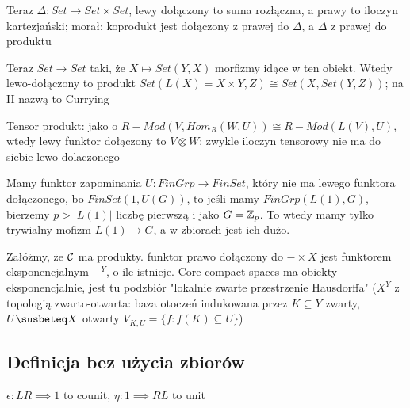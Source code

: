 
Teraz $\Delta:Set\to Set\times Set$, lewy dołączony to suma rozłączna, a prawy to iloczyn kartezjański; morał: koprodukt jest dołączony z prawej do $\Delta$, a $\Delta$ z prawej do produktu

Teraz $Set\to Set$ taki, że $X\mapsto Set(Y, X)$ morfizmy idące w ten obiekt. Wtedy lewo-dołączony to produkt $Set(L(X)=X\times Y, Z)\cong Set(X, Set(Y, Z))$; na II nazwą to Currying


Tensor produkt: jako o $R-Mod(V, Hom_R(W, U))\cong R-Mod(L(V), U)$, wtedy lewy funktor dołączony to $V\otimes W$; zwykle iloczyn tensorowy nie ma do siebie lewo dolaczonego

Mamy funktor zapominania $U:FinGrp\to FinSet$, który nie ma lewego funktora dołączonego, bo $FinSet(1, U(G))$, to jeśli mamy $FinGrp(L(1), G)$, bierzemy $p>|L(1)|$ liczbę pierwszą i jako $G=\mathbb{Z}_p$. To wtedy mamy tylko trywialny mofizm $L(1)\to G$, a w zbiorach jest ich dużo.

Załóżmy, że $\mathcal{C}$ ma produkty. funktor prawo dołączony do $-\times X$ jest funktorem eksponencjalnym $-^Y$, o ile istnieje. Core-compact spaces ma obiekty eksponencjalnie, jest tu podzbiór "lokalnie zwarte przestrzenie Hausdorffa" ($X^Y$ z topologią zwarto-otwarta: baza otoczeń indukowana przez $K\subseteq Y$ zwarty, $U\susbeteq X$ otwarty $V_{K,U}=\{f:f(K)\subseteq U\}$)

\subsection{Definicja bez użycia zbiorów}

\begin{definition}{}{}
$\epsilon:LR\implies 1$ to counit, $\eta:1\implies RL$ to unit
  
  \begin{center}
  \end{center}
  \begin{center}
  \end{center}
\end{definition}

